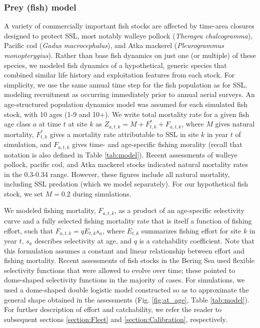 \documentclass[nonumbib,leqno]{nrc1}
\begin{document}
\subsubsection{Prey (fish) model}

A variety of commercially important fish stocks are affected by time-area closures designed to protect SSL, most notably walleye pollock ({\it Theragra chalcogramma}), Pacific cod ({\it Gadus macrocephalus}), and Atka mackerel ({\it Pleurogrammus monopterygius}).  Rather than base fish dynamics on just one (or multiple) of these species, we modeled fish dynamics of a hypothetical, generic species that combined similar life history and exploitation features from each stock.  For simplicity, we use the same annual time step for the fish population as for SSL, modeling recruitment as occurring immediately prior to annual aerial surveys.  An age-structured population dynamics model was assumed for each simulated fish stock, with 10 ages (1-9 and 10+).
We write total mortality rate for a given fish age class $a$ at time $t$ at site $k$ as $Z_{a,t,k}=M + F_{t,k}^* + F_{a,t,k}$, where $M$ gives
natural mortality, $F_{t,k}^*$ gives a mortality rate attributable to SSL in site $k$ in year $t$ of simulation, and $F_{a,t,k}$ gives time- and age-specific fishing morality (recall that notation is also defined in Table \ref{tab:model}).  Recent assessments of walleye pollock, pacific cod, and Atka mackerel stocks \citep[e.g.][]{PollockAssessment2011,PacCodAssessment2011,AtkaAssessment2012} indicated natural mortality rates in the 0.3-0.34 range.  However, these figures include all natural mortality, including SSL predation (which we model separately).  For our hypothetical fish stock, we set $M=0.2$ during simulations.

We modeled fishing mortality, $F_{a,t,k}$, as a product of an age-specific selectivity curve and a fully selected fishing mortality rate that is itself a function of fishing effort, such that $F_{a,t,k}=q E_{t,k} s_a$, where $E_{t,k}$ summarizes fishing effort for site $k$ in year $t$, $s_a$ describes selectivity at age, and $q$ is a catchability coefficient. Note that this formulation assumes a constant and linear relationship between effort and fishing mortality.  Recent assessments of fish stocks in the Bering Sea used flexible selectivity functions that were allowed to evolve over time; these pointed to dome-shaped selectivity functions in the majority of cases.  For simulations, we used a dome-shaped double logistic model constructed so as to approximate the general shape obtained in the assessments (Fig. \ref{fig:at_age}, Table \ref{tab:model}).  For further description of effort and catchability, we refer the reader to subsequent sections \ref{section:Fleet} and \ref{section:Calibration}, respectively.
\end{document}
